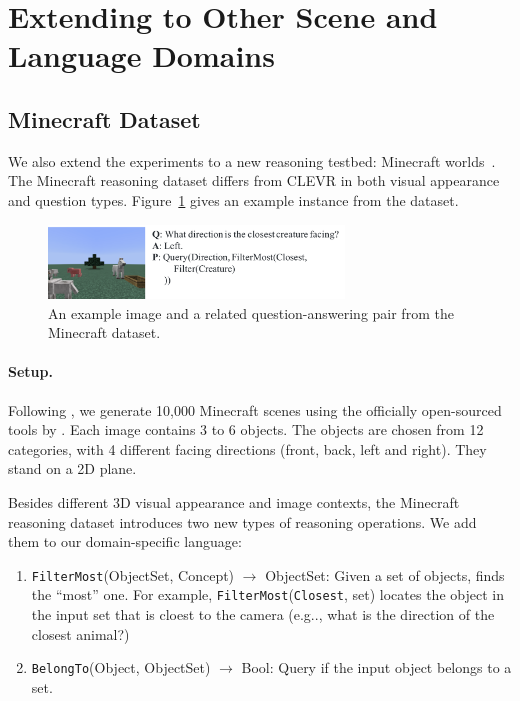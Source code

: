 \documentclass{article} %
\makeatletter
\DeclareRobustCommand\onedot{\futurelet\@let@token\@onedot}
\def\@onedot{\ifx\@let@token.\else.\null\fi\xspace}
\def\eg{e.g\onedot} \def\Eg{E.g\onedot}
\makeatother
\begin{document}
{\section{Extending to Other Scene and Language Domains}
\label{sec:app:new}

\subsection{Minecraft Dataset}
\label{sec:app:mc}
We also extend the experiments to a new reasoning testbed: Minecraft worlds~\citep{kexin}. The Minecraft reasoning dataset differs from CLEVR in both visual appearance and question types. Figure~\ref{fig:mc:example} gives an example instance from the dataset.

\begin{figure}[thbp]
    \centering
    \includegraphics[width=0.7\textwidth]{raw/MCExample.pdf}
    \caption{An example image and a related question-answering pair from the Minecraft dataset.}
    \label{fig:mc:example}
\end{figure}

\paragraph{Setup. } Following \cite{kexin}, we generate 10,000 Minecraft scenes using the officially open-sourced tools by \cite{Wu2017Neural}. Each image contains 3 to 6 objects. The objects are chosen from 12 categories, with 4 different facing directions (front, back, left and right). They stand on a 2D plane.

Besides different 3D visual appearance and image contexts, the Minecraft reasoning dataset introduces two new types of reasoning operations. We add them to our domain-specific language:

\begin{enumerate}
    \item {\tt FilterMost}(ObjectSet, Concept) $\rightarrow$ ObjectSet: Given a set of objects, finds the ``most'' one. For example, {\tt FilterMost}({\tt Closest}, set) locates the object in the input set that is cloest to the camera (\eg, what is the direction of the closest animal?)
    \item {\tt BelongTo}(Object, ObjectSet) $\rightarrow$ Bool: Query if the input object belongs to a set.
\end{enumerate}

}
\end{document}
